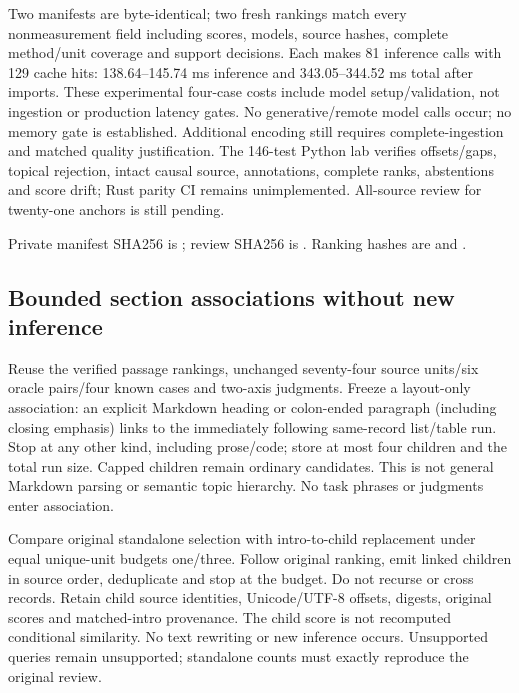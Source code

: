 \documentclass[11pt]{article}
\begin{document}
Two manifests are byte-identical; two fresh rankings match every nonmeasurement
field including scores, models, source hashes, complete method/unit coverage and
support decisions. Each makes 81 inference calls with 129 cache hits: 138.64--145.74
ms inference and 343.05--344.52 ms total after imports. These experimental four-case
costs include model setup/validation, not ingestion or production latency gates.
No generative/remote model calls occur; no memory gate is established. Additional
encoding still requires complete-ingestion and matched quality justification.
The 146-test Python lab verifies offsets/gaps, topical rejection, intact causal
source, annotations, complete ranks, abstentions and score drift; Rust parity CI
remains unimplemented. All-source review for twenty-one anchors is still pending.

Private manifest SHA256 is
;
review SHA256 is
.
Ranking hashes are
and .

\subsection{Bounded section associations without new inference}
Reuse the verified passage rankings, unchanged seventy-four source units/six oracle
pairs/four known cases and two-axis judgments. Freeze a layout-only association:
an explicit Markdown heading or colon-ended paragraph (including closing emphasis)
links to the immediately following same-record list/table run. Stop at any other
kind, including prose/code; store at most four children and the total run size.
Capped children remain ordinary candidates. This is not general Markdown parsing
or semantic topic hierarchy. No task phrases or judgments enter association.

Compare original standalone selection with intro-to-child replacement under equal
unique-unit budgets one/three. Follow original ranking, emit linked children in
source order, deduplicate and stop at the budget. Do not recurse or cross records.
Retain child source identities, Unicode/UTF-8 offsets, digests, original scores and
matched-intro provenance. The child score is not recomputed conditional similarity.
No text rewriting or new inference occurs. Unsupported queries remain unsupported;
standalone counts must exactly reproduce the original review.
\end{document}
